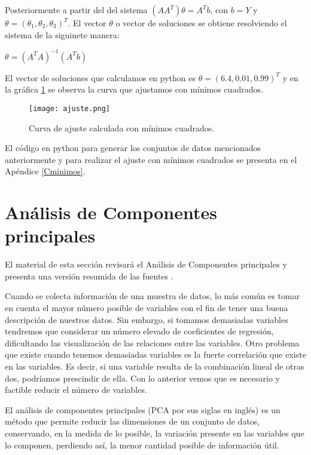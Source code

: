 Posteriormente a partir del del sistema $(AA^{T})\theta = A^{T}b$, con $b = Y$ y $\theta = (\theta_{1}, \theta_{2}, \theta_{3})^{T}$. El vector $\theta$ o vector de soluciones se obtiene resolviendo el sistema de la siguinete manera: 

\begin{center}
$\theta = (A^{T}A)^{-1}(A^{T}b)$
\end{center}

El vector de soluciones que calculamos en python es $\theta = (6.4, 0.01 ,0.99)^{T} $ y en la gráfica \ref{ajuste} se observa la curva que ajustamos con mínimos cuadrados.

\begin{figure}
\centering
\texttt{[image: ajuste.png]}
\caption{Curva de ajuste calculada con mínimos cuadrados.}\label{ajuste}
\end{figure}
	

El código en python para generar los conjuntos de datos mencionados anteriormente y para realizar el ajuste con mínimos cuadrados se presenta en el Apéndice \ref{Cminimos}.
  
\section{Análisis de Componentes principales}

El material de esta sección revisará el Análisis de Componentes principales y presenta una versión resumida de las fuentes .

Cuando se colecta información de una muestra de datos, lo más común es tomar en cuenta el mayor número posible de variables con el fin de tener una buena descripción de nuestros datos. Sin embargo, si tomamos demasiadas variables tendremos que considerar un número elevado de coeficientes de regresión, dificultando las visualización de las relaciones entre las variables. Otro problema que existe cuando tenemos demasiadas variables es la fuerte correlación que existe en las variables. Es decir, si una variable resulta de la combinación lineal de otras dos, podríamos prescindir de ella. Con lo anterior vemos que es necesario y factible reducir el número de variables. 

El análisis de componentes principales (PCA por sus siglas en inglés) es un método que permite reducir las dimensiones de un conjunto de datos, conservando, en la medida de lo posible, la variación presente en las variables que lo componen, perdiendo así, la menor cantidad posible de información útil. 

